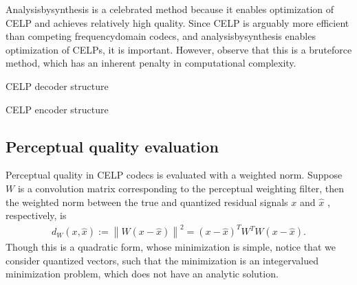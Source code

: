 \documentclass[letterpaper,10pt,english]{jupyterBook}
\begin{document}
\sphinxAtStartPar
Analysis\sphinxhyphen{}by\sphinxhyphen{}synthesis is a celebrated method because it enables
optimization of CELP and achieves relatively high quality. Since CELP is
arguably more efficient than competing frequency\sphinxhyphen{}domain codecs, and
analysis\sphinxhyphen{}by\sphinxhyphen{}synthesis enables optimization of CELPs, it is important.
However, observe that this is a brute\sphinxhyphen{}force method, which has an
inherent penalty in computational complexity.

\sphinxAtStartPar
{}

\sphinxAtStartPar
CELP decoder structure

\sphinxAtStartPar
{}
CELP encoder structure


\subsection{Perceptual quality evaluation}
\label{\detokenize{Transmission/Code-excited_linear_prediction_CELP:perceptual-quality-evaluation}}
\sphinxAtStartPar
Perceptual quality in CELP codecs is evaluated with a weighted norm.
Suppose \(W\) is a convolution matrix corresponding to the perceptual
weighting filter, then the weighted norm between the true and quantized
residual signals \(x\) and \( \hat x \) , respectively, is
\begin{equation*}
\begin{split} d_W(x,\hat x):=\left\| W(x-\hat x)\right\|^2 = (x-\hat
x)^T W^T W (x-\hat x). \end{split}
\end{equation*}
\sphinxAtStartPar
Though this is a quadratic form, whose minimization is simple, notice
that we consider quantized vectors, such that the minimization is an
integer\sphinxhyphen{}valued minimization problem, which does not have an analytic
solution.
\end{document}
